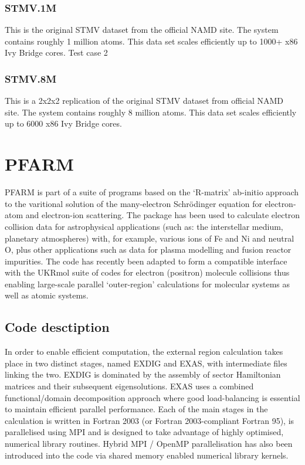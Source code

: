 \subsubsection{STMV.1M}
This is the original STMV dataset from the official NAMD site. The system contains roughly 1 million atoms. This data set scales efficiently up to 1000+ x86 Ivy Bridge cores.
Test case 2

\subsubsection{STMV.8M}
This is a 2x2x2 replication of the original STMV dataset from official NAMD site. The system contains roughly 8 million atoms. This data set scales efficiently up to 6000 x86 Ivy Bridge cores.

\section{PFARM}
PFARM is part of a suite of programs based on the ‘R-matrix’ ab-initio approach to the varitional solution of the many-electron Schrödinger equation for electron-atom and electron-ion scattering. The package has been used to calculate electron collision data for astrophysical applications (such as: the interstellar medium, planetary atmospheres) with, for example, various ions of Fe and Ni and neutral O, plus other applications such as data for plasma modelling and fusion reactor impurities. The code has recently been adapted to form a compatible interface with the UKRmol suite of codes for electron (positron) molecule collisions thus enabling large-scale parallel ‘outer-region’ calculations for molecular systems as well as atomic systems.

\subsection{Code desctiption}
In order to enable efficient computation, the external region calculation takes place in two distinct stages, named EXDIG and EXAS, with intermediate files linking the two. EXDIG is dominated by the assembly of sector Hamiltonian matrices and their subsequent eigensolutions. EXAS uses a combined functional/domain decomposition approach where good load-balancing is essential to maintain efficient parallel performance. Each of the main stages in the calculation is written in Fortran 2003 (or Fortran 2003-compliant Fortran 95), is parallelised using MPI and is designed to take advantage of highly optimised, numerical library routines. Hybrid MPI / OpenMP parallelisation has also been introduced into the code via shared memory enabled numerical library kernels.

